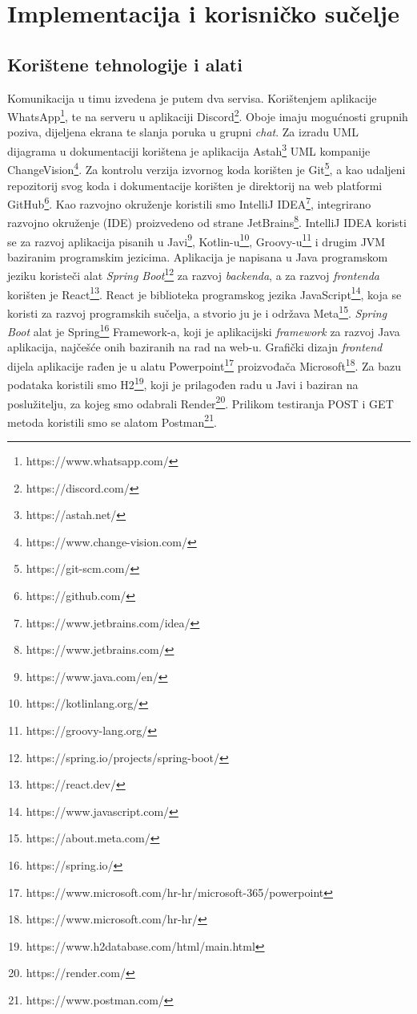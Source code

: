 \chapter{Implementacija i korisničko sučelje}
		
		
		\section{Korištene tehnologije i alati}
		
			Komunikacija u timu izvedena je putem dva servisa. Korištenjem aplikacije WhatsApp\footnote{https://www.whatsapp.com/}, te na serveru u aplikaciji Discord\footnote{https://discord.com/}. Oboje imaju mogućnosti grupnih poziva, dijeljena ekrana te slanja poruka u grupni \textit{chat}. 
			Za izradu UML dijagrama u dokumentaciji korištena je aplikacija Astah\footnote{https://astah.net/} UML kompanije ChangeVision\footnote{https://www.change-vision.com/}. Za kontrolu verzija izvornog koda korišten je Git\footnote{https://git-scm.com/}, a kao udaljeni repozitorij svog koda i dokumentacije korišten je direktorij na web platformi GitHub\footnote{https://github.com/}.
			Kao razvojno okruženje koristili smo IntelliJ IDEA\footnote{https://www.jetbrains.com/idea/}, integrirano razvojno okruženje (IDE) proizvedeno od strane JetBrains\footnote{https://www.jetbrains.com/}. IntelliJ IDEA koristi se za razvoj aplikacija pisanih u Javi\footnote{https://www.java.com/en/}, Kotlin-u\footnote{https://kotlinlang.org/}, Groovy-u\footnote{https://groovy-lang.org/} i drugim JVM baziranim programskim jezicima.
			Aplikacija je napisana u Java programskom jeziku koristeči alat \textit{Spring Boot}\footnote{https://spring.io/projects/spring-boot/} za razvoj \textit{backenda}, a za razvoj \textit{frontenda} korišten je React\footnote{https://react.dev/}. React je biblioteka programskog jezika JavaScript\footnote{https://www.javascript.com/}, koja se koristi za razvoj programskih sučelja, a stvorio ju je i održava Meta\footnote{https://about.meta.com/}. \textit{Spring Boot} alat je Spring\footnote{https://spring.io/} Framework-a, koji je aplikacijski \textit{framework} za razvoj Java aplikacija, najčešće onih baziranih na rad na web-u.
			Grafički dizajn \textit{frontend} dijela aplikacije rađen je u alatu Powerpoint\footnote{https://www.microsoft.com/hr-hr/microsoft-365/powerpoint} proizvođača Microsoft\footnote{https://www.microsoft.com/hr-hr/}.
			Za bazu podataka koristili smo H2\footnote{https://www.h2database.com/html/main.html}, koji je prilagođen radu u Javi i baziran na poslužitelju, za kojeg smo odabrali Render\footnote{https://render.com/}. Prilikom testiranja POST i GET metoda koristili smo se alatom Postman\footnote{https://www.postman.com/}.
			
